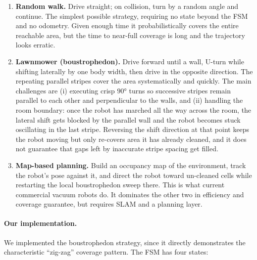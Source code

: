 \documentclass[12pt, a4paper]{article}
\begin{document}
\begin{enumerate}
    \item \textbf{Random walk.}  Drive straight; on collision, turn by a random
          angle and continue.  The simplest possible strategy, requiring no
          state beyond the FSM and no odometry.  Given enough time it
          probabilistically covers the entire reachable area, but the time to
          near-full coverage is long and the trajectory looks erratic.

    \item \textbf{Lawnmower (boustrophedon).}  Drive forward until a wall,
          U-turn while shifting laterally by one body width, then drive in
          the opposite direction.  The repeating parallel stripes cover the
          area systematically and quickly.  The main challenges are
          (i) executing crisp $90°$ turns so successive stripes remain
          parallel to each other and perpendicular to the walls, and
          (ii) handling the room boundary: once the robot has marched all the
          way across the room, the lateral shift gets blocked by the parallel
          wall and the robot becomes stuck oscillating in the last stripe.
          Reversing the shift direction at that point keeps the robot moving
          but only re-covers area it has already cleaned, and it does not
          guarantee that gaps left by inaccurate stripe spacing get filled.

    \item \textbf{Map-based planning.}  Build an occupancy map of the
          environment, track the robot's pose against it, and direct the
          robot toward un-cleaned cells while restarting the local
          boustrophedon sweep there.  This is what current commercial vacuum
          robots do.  It dominates the other two in efficiency and coverage
          guarantee, but requires SLAM and a planning layer.
\end{enumerate}

\paragraph{Our implementation.}
We implemented the boustrophedon strategy, since it directly demonstrates the
characteristic ``zig-zag'' coverage pattern.  The FSM has four states:
\end{document}
